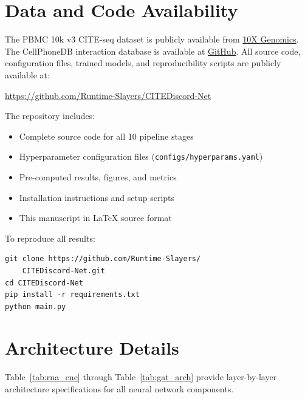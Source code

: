 \documentclass[11pt,a4paper]{article}
\begin{document}
\section*{Data and Code Availability}

The PBMC 10k v3 CITE-seq dataset is publicly available from \href{https://www.10xgenomics.com/datasets/10k-human-pbmcs-3-ht-v3-1-chromium-x-3-1-high}{10X Genomics}.
The CellPhoneDB interaction database is available at \href{https://github.com/Teichlab/cellphonedb-data}{GitHub}.
All source code, configuration files, trained models, and reproducibility scripts are publicly available at:

\begin{center}
\url{https://github.com/Runtime-Slayers/CITEDiscord-Net}
\end{center}

\noindent The repository includes:
\begin{itemize}[leftmargin=*]
  \item Complete source code for all 10 pipeline stages
  \item Hyperparameter configuration files (\texttt{configs/hyperparams.yaml})
  \item Pre-computed results, figures, and metrics
  \item Installation instructions and setup scripts
  \item This manuscript in \LaTeX{} source format
\end{itemize}

\noindent To reproduce all results:
\begin{verbatim}
git clone https://github.com/Runtime-Slayers/
    CITEDiscord-Net.git
cd CITEDiscord-Net
pip install -r requirements.txt
python main.py
\end{verbatim}

\appendix

\section{Architecture Details}\label{app:architecture}

Table~\ref{tab:rna_enc} through Table~\ref{tab:gat_arch} provide layer-by-layer architecture specifications for all neural network components.
\end{document}
